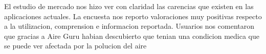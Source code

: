 \begin{itemize}
    \done El estudio de mercado nos hizo ver con claridad las carencias que existen en las aplicaciones actuales.
    \done La encuesta nos reporto valoraciones muy positivas respecto a la utilizacion, comprension e informacion reportada.
    \done Usuarios nos comentaron que gracias a Aire Guru habian descubierto que tenian una condicion medica que se puede ver afectada por
    la polucion del aire

\end{itemize}
 

\newpage
